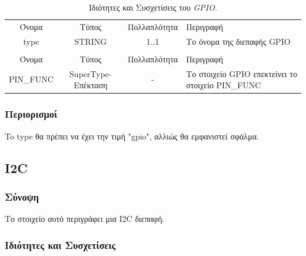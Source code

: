 \begin{table}[H]
	\begin{center}
		\begin{tabular}{ | c | c | c| m{5.5cm} | }
			\hline
			\rowcolor{Gray}
			\multicolumn{4}{|c|}{\textbf{Ιδιότητες}}\\
			\hline
			\rowcolor{Gray}
			Όνομα & Τύπος & Πολλαπλότητα & Περιγραφή \\
			\hline
			type & STRING & 1..1 & Το όνομα της διεπαφής GPIO \\
			\hline
			\rowcolor{Gray}
			\multicolumn{4}{|c|}{\textbf{Συσχετίσεις}}\\
			\hline
			\rowcolor{Gray}
			Όνομα & Τύπος & Πολλαπλότητα & Περιγραφή \\
			\hline
			PIN\_FUNC & SuperType-Επέκταση & - &  Το στοιχείο GPIO επεκτείνει το στοιχείο PIN\_FUNC \\
			\hline
		\end{tabular}
		\caption{Ιδιότητες και Συσχετίσεις του \textit{GPIO}.}
		\label{tab:gpio}
	\end{center}
\end{table}

\subsubsection*{Περιορισμοί}

\noindent To type θα πρέπει να έχει την τιμή "gpio", αλλιώς θα εμφανιστεί σφάλμα.

\subsection{I2C}
\label{subsec:i2c}

\subsubsection*{Σύνοψη}

\noindent Το στοιχείο αυτό περιγράφει μια I2C διεπαφή.

\subsubsection*{Ιδιότητες και Συσχετίσεις}

